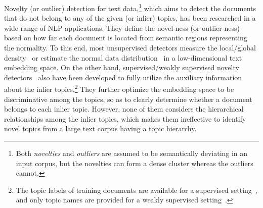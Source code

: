 \label{subsec:novelty}
Novelty (or outlier) detection for text data,\footnote{Both \textit{novelties} and \textit{outliers} are assumed to be semantically deviating in an input corpus, but the novelties can form a dense cluster whereas the outliers cannot.}
which aims to detect the documents that do not belong to any of the given (or inlier) topics, has been researched in a wide range of NLP applications.
They define the novel-ness (or outlier-ness) based on how far each document is located from semantic regions representing the normality.
To this end, most unsupervised detectors measure the local/global density~\cite{breunig2000lof, sathe2016subspace} or estimate the normal data distribution~\cite{zhuang2017identifying,ruff2019self,manolache2021date} in a low-dimensional text embedding space.
On the other hand, supervised/weakly supervised novelty detectors~\cite{hendrycks2020pretrained, lee2020multi, lee2021out, zeng2021adversarial, fouche2020mining} also have been developed to fully utilize the auxiliary information about the inlier topics.\footnote{The topic labels of training documents are available for a supervised setting~\cite{fouche2020mining, lee2020multi, hendrycks2020pretrained, zeng2021adversarial}, and only topic names are provided for a weakly supervised setting~\cite{lee2021out}.}
They further optimize the embedding space to be discriminative among the topics, so as to clearly determine whether a document belongs to each inlier topic.
However, none of them considers the hierarchical relationships among the inlier topics, 
which makes them ineffective to identify novel topics from a large text corpus having a topic hierarchy.
